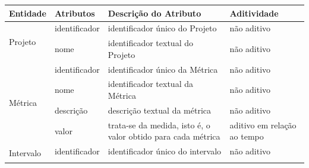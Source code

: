 \begin{table}[h]
\centering
\begin{tabular}{|p{2cm}|p{2.5cm}|p{4cm}|p{2cm}|}
\hline
Entidade                   & Atributos                & Descrição do Atributo  & Aditividade                 \\ \hline


\multirow{2}{*}{Projeto}   & identificador            & identificador único do Projeto                                                                                                                                                                                                        & não aditivo                 \\ \cline{2-4} 
                           & nome                     & identificador textual do Projeto                                                                                                                                                                                                      & não aditivo                 \\ \hline
\multirow{4}{*}{Métrica}   & identificador            & identificador único da Métrica                                                                                                                                                                                                        & não aditivo                 \\ \cline{2-4} 
                           & nome                     & identificador textual da Métrica                                                                                                                                                                                                      & não aditivo                 \\ \cline{2-4} 
                           & descrição                & descrição textual da métrica                                                                                                                                                                                                          & não aditivo                 \\ \cline{2-4} 
                           & valor                    & trata-se da medida, isto é, o valor obtido para cada métrica                                                                                                                                                                          & aditivo em relação ao tempo \\ \hline
\multirow{5}{*}{Intervalo} & identificador            & identificador único do intervalo                                                                                                                                                                                                      & não aditivo                 \\ \cline{2-4} 

\end{tabular}
\end{table}
